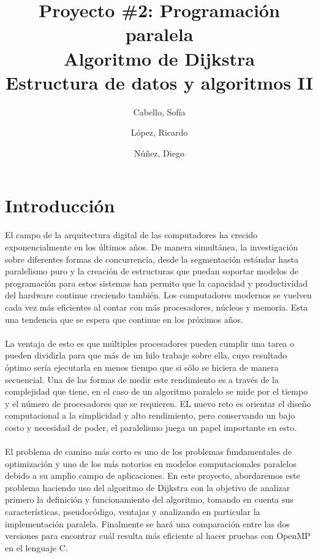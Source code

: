 \documentclass[11pt]{article}
\title{Proyecto \#2: Programación paralela\\
Algoritmo de Dijkstra\\
\large Estructura de datos y algoritmos II}
\author{Cabello, Sofía
\and López, Ricardo
\and Núñez, Diego}
\begin{document}
\maketitle{}

\section{Introducción}
El campo de la arquitectura digital de las computadores ha crecido exponencialmente en los últimos años. De manera simultánea, la investigación sobre diferentes formas de concurrencia, desde la segmentación estándar hasta paralelismo puro y la creación de estructuras que puedan soportar modelos de programación para estos sistemas han permito que la capacidad y productividad del hardware continue creciendo también. Los computadores modernos se vuelven cada vez más eficientes al contar con más procesadores, núcleos y memoria. Esta una tendencia que se espera que continue en los próximos años. 

\paragraph{}
La ventaja de esto es que múltiples procesadores pueden cumplir una tarea o pueden dividirla para que más de un hilo trabaje sobre ella, cuyo resultado óptimo sería ejecutarla en menos tiempo que si sólo se hiciera de manera secuencial. Una de las formas de medir este rendimiento es a través de la complejidad que tiene, en el caso de un algoritmo paralelo se mide por el tiempo y el número de procesadores que se requieren. EL nuevo reto es orientar el diseño computacional a la simplicidad y alto rendimiento, pero conservando un bajo costo y necesidad de poder, el paralelismo juega un papel importante en esto. 

\paragraph{}
El problema de camino más corto es uno de los problemas fundamentales de optimización y uno de los más notorios en modelos computacionales paralelos debido a su amplio campo de aplicaciones. En este proyecto, abordaremos este problema haciendo uso del algoritmo de Dijkstra con la objetivo de analizar primero la definición y funcionamiento del algoritmo, tomando en cuenta sus características, pseudocódigo, ventajas y analizando en particular la implementación paralela. Finalmente se hará una comparación entre las dos versiones para encontrar cuál resulta más eficiente al hacer pruebas con OpenMP en el lenguaje C. 
\end{document}
